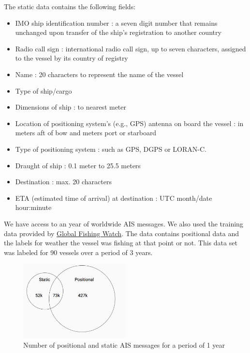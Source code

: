 The static data contains the following fields:

\begin{itemize}
\item IMO ship identification number : a seven digit number that remains unchanged upon transfer of the ship's registration to another country
\item Radio call sign : international radio call sign, up to seven characters, assigned to the vessel by its country of registry
\item Name : 20 characters to represent the name of the vessel
\item Type of ship/cargo
\item Dimensions of ship : to nearest meter
\item Location of positioning system's (e.g., GPS) antenna on board the vessel : in meters aft of bow and meters port or starboard
\item Type of positioning system : such as GPS, DGPS or LORAN-C.
\item Draught of ship : 0.1 meter to 25.5 meters
\item Destination : max. 20 characters
\item ETA (estimated time of arrival) at destination : UTC month/date hour:minute
\end{itemize}

We have access to an year of worldwide AIS messages. We also used the training data provided by \href{globalfishingwatch.github.io}{Global Fishing Watch}. The data contains positional data and the labels for weather the vessel was fishing at that point or not. This data set was labeled for 90 vessels over a period of 3 years.

\begin{figure}[H]
\centering
\includegraphics[width=0.5\textwidth]{images/ais_summary.png}
\caption{\label{fig:AIS broadcast summary}Number of positional and static AIS messages for a period of 1 year}
\end{figure}

